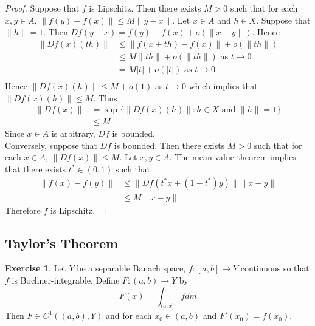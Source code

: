 \documentclass[12pt]{amsart}
\theoremstyle{definition}
\newtheorem{ex}[definition]{Exercise}
\DeclareMathOperator*{\0}{\mbf{0}}
\DeclareMathOperator*{\1}{\mbf{1}}
\newcommand{\lex}[1]{\label{ex:#1}}
\begin{document}
	\begin{proof}
		Suppose that $f$ is Lipschitz. Then there exists $M > 0$ such that for each $x, y \in A$, $\|f(y) - f(x)\| \leq M \|y - x\|$. Let $x \in A$ and $h \in X$. Suppose that $\|h\| = 1$. Then $Df(y-x) = f(y) - f(x) + o(\|x-y\|)$. Hence 
		\begin{align*}
			\|Df(x)(th)\| 
			& \leq \|f(x +th) - f(x)\| + o(\|th\|) \\
			& \leq M \|th\|  + o(\|th\|)  \text{ as $t \rightarrow 0$}\\
			& = M |t|  + o(|t|)  \text{ as $t \rightarrow 0$}\\
		\end{align*}
		Hence $\|Df(x)(h)\| \leq M + o(1) $ as $t \rightarrow 0$ which implies that $\|Df(x)(h)\| \leq M $. Thus 
		\begin{align*}
			\|Df(x)\| 
			& = \sup \{\|Df(x)(h)\|: h \in X \text{ and $\|h\| =1 $}\} \\
			& \leq M
		\end{align*}
		Since $x \in A$ is arbitrary, $Df$ is bounded.\\
		Conversely, suppose that $Df$ is bounded. Then there exists $M > 0$ such that for each $x \in A$, $\|Df(x)\| \leq M$. Let $x,y \in A$. The mean value theorem implies that there exists $t^* \in (0,1)$ such that 
		\begin{align*}
			\|f(x) - f(y)\| 
			& \leq \|Df(t^*x + (1-t^*)y)\|\|x-y\| \\
			& \leq M \|x-y\|
		\end{align*}
		Therefore $f$ is Lipschitz.
	\end{proof}
	
	
	
	
	
	
	
	
	
	
	\newpage
	\subsection{Taylor's Theorem}
	
	\begin{ex} \lex{}
	Let $Y$ be a separable Banach space, $f:[a,b] \rightarrow Y$ continuous so that $f$ is Bochner-integrable. Define $F:(a,b) \rightarrow Y$ by  $$F(x) = \int_{(a, x]}f dm$$ Then $F \in C^1((a,b), Y)$ and for each $x_0 \in (a,b)$ and $F'(x_0) = f(x_0)$.
	\end{ex}
	
\end{document}
